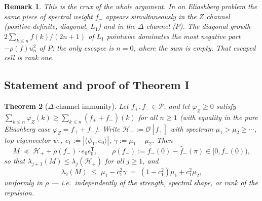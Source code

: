 \documentclass[11pt]{article}
\newtheorem{theorem}{Theorem}[section]
\newtheorem{remark}[theorem]{Remark}
\newcommand{\HH}{\mathcal{H}}
\newcommand{\OO}{\mathcal{O}}
\newcommand{\PP}{\mathcal{P}}
\begin{document}
\begin{remark}
This is the crux of the whole argument. In an Eliashberg problem the same
piece of spectral weight $f_-$ appears simultaneously in the $Z$ channel
(positive-definite, diagonal, $L_1$) and in the $\Delta$ channel ($P$). The
diagonal growth $2\sum_{k\le n}f(k)/(2n+1)$ of $L_1$ \emph{pointwise}
dominates the most negative part $-\rho(f)u_n^2$ of $P$; the only escapee is
$n=0$, where the sum is empty. That escaped cell is rank one.
\end{remark}

\subsection{Statement and proof of Theorem I}

\begin{theorem}[$\Delta$-channel immunity]\label{thm:main}
Let $f_+,f_-\in\PP$, and let $\varphi_Z\ge0$ satisfy
$\sum_{k\le n}\varphi_Z(k)\ge\sum_{k\le n}(f_++f_-)(k)$ for all $n\ge1$
(with equality in the pure Eliashberg case $\varphi_Z=f_++f_-$). Write
$\HH_+:=\OO[f_+]$ with spectrum $\mu_1>\mu_2\ge\cdots$, top eigenvector
$\psi_1$, $c_1:=|\langle\psi_1,e_0\rangle|$, $\gamma:=\mu_1-\mu_2$. Then
\begin{equation}\label{eq:majorant}
 M\;\preceq\;\HH_++\rho(f_-)\cdot e_0e_0^{\mathsf T},\qquad \rho(f_-):=f_-(0)-\hat f_-(\pi)\in[0,f_-(0)),
\end{equation}
so that $\lambda_{j+1}(M)\le\lambda_j(\HH_+)$ for all $j\ge1$, and
\begin{equation}\label{eq:lambda2bound}
 \lambda_2(M)\;\le\;\mu_1-c_1^2\gamma \;=\; (1-c_1^2)\mu_1+c_1^2\mu_2,
\end{equation}
uniformly in $\rho$ --- i.e.\ independently of the strength, spectral shape,
or rank of the repulsion.
\end{theorem}
\end{document}
